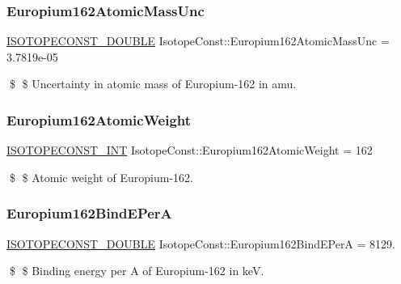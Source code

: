 \subsubsection{\texorpdfstring{Europium162\+Atomic\+Mass\+Unc}{Europium162AtomicMassUnc}}
{\footnotesize\ttfamily \mbox{\hyperlink{group___isotope_const-_macros_ga8f45a7272ce02c0b4c65c44636ed719a}{I\+S\+O\+T\+O\+P\+E\+C\+O\+N\+S\+T\+\_\+\+D\+O\+U\+B\+LE}} Isotope\+Const\+::\+Europium162\+Atomic\+Mass\+Unc = 3.\+7819e-\/05}

\$ \$ Uncertainty in atomic mass of Europium-\/162 in amu. \mbox{\label{group___isotope_const-_europium-_eu162_ga4ea2ca4a2f684bc5949b1722fd14c9c6}} 
\subsubsection{\texorpdfstring{Europium162\+Atomic\+Weight}{Europium162AtomicWeight}}
{\footnotesize\ttfamily \mbox{\hyperlink{group___isotope_const-_macros_ga5f18360b3e99483a35c32d789e62621c}{I\+S\+O\+T\+O\+P\+E\+C\+O\+N\+S\+T\+\_\+\+I\+NT}} Isotope\+Const\+::\+Europium162\+Atomic\+Weight = 162}

\$ \$ Atomic weight of Europium-\/162. \mbox{\label{group___isotope_const-_europium-_eu162_gad3cfda9dfd84526bed6491fe5d54866d}} 
\subsubsection{\texorpdfstring{Europium162\+Bind\+E\+PerA}{Europium162BindEPerA}}
{\footnotesize\ttfamily \mbox{\hyperlink{group___isotope_const-_macros_ga8f45a7272ce02c0b4c65c44636ed719a}{I\+S\+O\+T\+O\+P\+E\+C\+O\+N\+S\+T\+\_\+\+D\+O\+U\+B\+LE}} Isotope\+Const\+::\+Europium162\+Bind\+E\+PerA = 8129.}

\$ \$ Binding energy per A of Europium-\/162 in keV. \mbox{\label{group___isotope_const-_europium-_eu162_ga46f1c94a1a00e2b2f59842568d45473a}} 
